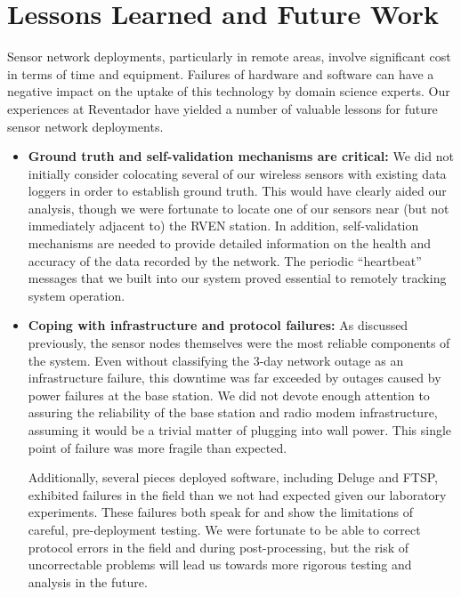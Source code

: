 \chapter{Lessons Learned and Future Work}
\label{chapter-lessons}


Sensor network deployments, particularly in remote areas, involve significant
cost in terms of time and equipment. Failures of hardware and software can
have a negative impact on the uptake of this technology by domain science
experts. Our experiences at Reventador have yielded a number of valuable
lessons for future sensor network deployments. 

\begin{itemize}

\item \textbf{Ground truth and self-validation mechanisms are critical:} We did
not initially consider colocating several of our wireless sensors with
existing data loggers in order to establish ground truth. This would have
clearly aided our analysis, though we were fortunate to locate one of our
sensors near (but not immediately adjacent to) the RVEN station.  In
addition, self-validation mechanisms are needed to provide detailed
information on the health and accuracy of the data recorded by the network.
The periodic ``heartbeat'' messages that we built into our system proved
essential to remotely tracking system operation.

\item \textbf{Coping with infrastructure and protocol failures:} As discussed
previously, the sensor nodes themselves were the most reliable components of
the system. Even without classifying the 3-day network outage as an
infrastructure failure, this downtime was far exceeded by outages caused by
power failures at the base station.  We did not devote enough attention to
assuring the reliability of the base station and radio modem infrastructure,
assuming it would be a trivial matter of plugging into wall power. This
single point of failure was more fragile than expected.

Additionally, several pieces deployed software, including Deluge and FTSP,
exhibited failures in the field than we not had expected given our laboratory
experiments.  These failures both speak for and show the limitations of
careful, pre-deployment testing.  We were fortunate to be able to correct
protocol errors in the field and during post-processing, but the risk of
uncorrectable problems will lead us towards more rigorous testing and
analysis in the future.


\end{itemize}
